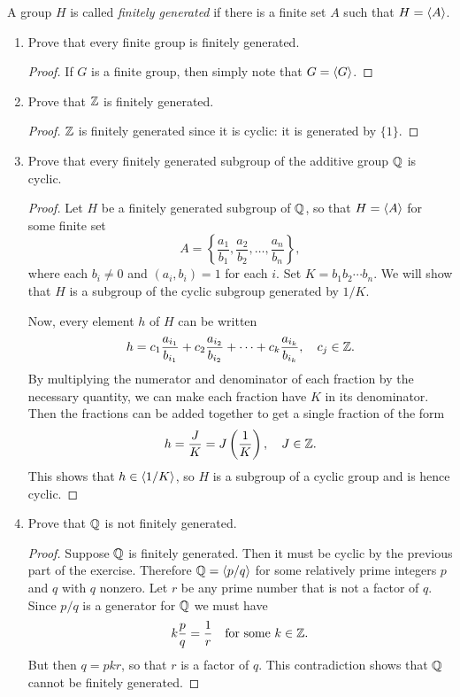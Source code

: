  A group $H$ is called {\em finitely generated} if there
is a finite set $A$ such that $H = \langle{A}\rangle$.
\begin{enumerate}
\item Prove that every finite group is finitely generated.
  \begin{proof}
    If $G$ is a finite group, then simply note that $G = \langle{G}\rangle$.
  \end{proof}
\item Prove that $\mathbb{Z}$ is finitely generated.
  \begin{proof}
    $\mathbb{Z}$ is finitely generated since it is cyclic: it is generated by
    $\{1\}$.
  \end{proof}
\item Prove that every finitely generated subgroup of the additive
  group $\mathbb{Q}$ is cyclic.
  \begin{proof}
    Let $H$ be a finitely generated subgroup of $\mathbb{Q}$, so that
    $H = \langle{A}\rangle$ for some finite set
    \begin{equation*}
      A = \left\{\frac{a_1}{b_1}, \frac{a_2}{b_2},
      \dots, \frac{a_n}{b_n}\right\},
    \end{equation*}
    where each $b_i\neq0$ and $(a_i,b_i) = 1$ for each $i$. Set
    $K = b_1b_2\cdots b_n$. We will show that $H$ is a subgroup of the
    cyclic subgroup generated by $1/K$.

    Now, every element $h$ of $H$ can be written
    \begin{equation*}
      h = c_1\frac{a_{i_1}}{b_{i_1}} + c_2\frac{a_{i_2}}{b_{i_2}}
      + \cdots + c_k\frac{a_{i_k}}{b_{i_k}},
      \quad c_j\in\mathbb{Z}.
    \end{equation*}
    By multiplying the numerator and denominator of each fraction by
    the necessary quantity, we can make each fraction have $K$ in its
    denominator. Then the fractions can be added together to get a
    single fraction of the form
    \begin{equation*}
      h = \frac{J}{K} = J\left(\frac1K\right), \quad J\in\mathbb{Z}.
    \end{equation*}
    This shows that $h\in\langle{1/K}\rangle$, so $H$ is a subgroup of a cyclic
    group and is hence cyclic.
  \end{proof}
\item Prove that $\mathbb{Q}$ is not finitely generated.
  \begin{proof}
    Suppose $\mathbb{Q}$ is finitely generated. Then it must be cyclic by the
    previous part of the exercise. Therefore $\mathbb{Q} = \langle{p/q}\rangle$ for some
    relatively prime integers $p$ and $q$ with $q$ nonzero. Let $r$ be
    any prime number that is not a factor of $q$. Since $p/q$ is a
    generator for $\mathbb{Q}$ we must have
    \begin{equation*}
      k\frac{p}{q} = \frac1r
      \quad\text{for some $k\in\mathbb{Z}$}.
    \end{equation*}
    But then $q = pkr$, so that $r$ is a factor of $q$. This
    contradiction shows that $\mathbb{Q}$ cannot be finitely generated.
  \end{proof}
\end{enumerate}
